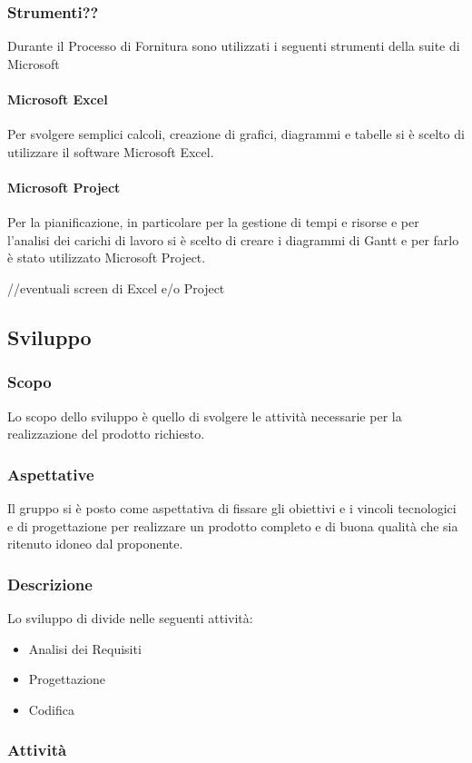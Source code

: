 \subsubsection{Strumenti??}
Durante il Processo di Fornitura sono utilizzati i seguenti strumenti della suite di Microsoft
\paragraph{Microsoft Excel}
Per svolgere semplici calcoli, creazione di grafici, diagrammi e tabelle si è scelto di utilizzare il software Microsoft Excel.
\paragraph{Microsoft Project}
Per la pianificazione, in particolare per la gestione di tempi e risorse e per l'analisi dei carichi di lavoro si è scelto di creare i diagrammi di Gantt e per farlo è stato utilizzato Microsoft Project.

//eventuali screen di Excel e/o Project

\subsection{Sviluppo}
\subsubsection{Scopo}
Lo scopo dello sviluppo è quello di svolgere le attività necessarie per la realizzazione del prodotto richiesto.
\subsubsection{Aspettative}
Il gruppo si è posto come aspettativa di fissare gli obiettivi e i vincoli tecnologici e di progettazione per realizzare un prodotto completo e di buona qualità che sia ritenuto idoneo dal proponente.
\subsubsection{Descrizione}
Lo sviluppo di divide nelle seguenti attività:
\begin{itemize}
	\item Analisi dei Requisiti
	\item Progettazione
	\item Codifica
\end{itemize}
\subsubsection{Attività}

